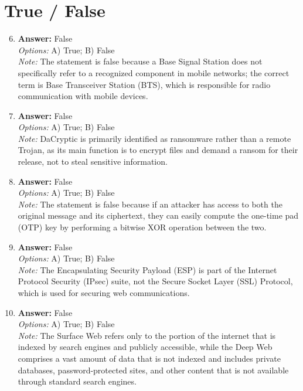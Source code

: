 \documentclass[12pt]{article}
\begin{document}
\section*{True / False}
\begin{enumerate}[label=\arabic*.]
\setcounter{enumi}{5}
\item \textbf{Answer:} False
\\ \textit{Options:} A) True; B) False
\\ \textit{Note:} The statement is false because a Base Signal Station does not specifically refer to a recognized component in mobile networks; the correct term is Base Transceiver Station (BTS), which is responsible for radio communication with mobile devices.
\item \textbf{Answer:} False
\\ \textit{Options:} A) True; B) False
\\ \textit{Note:} DaCryptic is primarily identified as ransomware rather than a remote Trojan, as its main function is to encrypt files and demand a ransom for their release, not to steal sensitive information.
\item \textbf{Answer:} False
\\ \textit{Options:} A) True; B) False
\\ \textit{Note:} The statement is false because if an attacker has access to both the original message and its ciphertext, they can easily compute the one-time pad (OTP) key by performing a bitwise XOR operation between the two.
\item \textbf{Answer:} False
\\ \textit{Options:} A) True; B) False
\\ \textit{Note:} The Encapsulating Security Payload (ESP) is part of the Internet Protocol Security (IPsec) suite, not the Secure Socket Layer (SSL) Protocol, which is used for securing web communications.
\item \textbf{Answer:} False
\\ \textit{Options:} A) True; B) False
\\ \textit{Note:} The Surface Web refers only to the portion of the internet that is indexed by search engines and publicly accessible, while the Deep Web comprises a vast amount of data that is not indexed and includes private databases, password-protected sites, and other content that is not available through standard search engines.
\end{enumerate}
\end{document}
